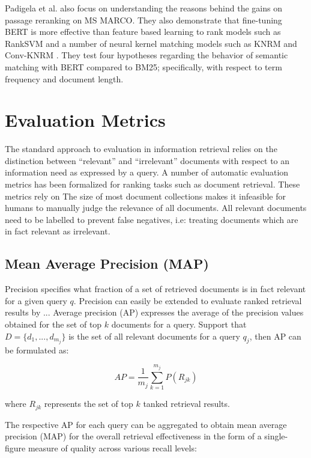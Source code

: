 Padigela et al. \cite{Padigela:1905.01758:2019} also focus on understanding the reasons behind the gains on passage reranking on MS MARCO.
They also demonstrate that fine-tuning BERT is more effective than feature based learning to rank models such as RankSVM \cite{joachims2002optimizing} and a number of neural kernel matching models such as KNRM \cite{xiong2017knrm} and Conv-KNRM \cite{dai2018convolutional}.
They test four hypotheses regarding the behavior of semantic matching with BERT compared to BM25; specifically, with respect to term frequency and document length.

\section{Evaluation Metrics}

The standard approach to evaluation in information retrieval relies on the distinction between ``relevant'' and ``irrelevant'' documents with respect to an information need as expressed by a query.
A number of automatic evaluation metrics has been formalized for ranking tasks such as document retrieval.
These metrics rely on 
The size of most document collections makes it infeasible for humans to manually judge the relevance of all documents.
All relevant documents need to be labelled to prevent false negatives, i.e: treating documents which are in fact relevant as irrelevant.

\subsection{Mean Average Precision (MAP)}

Precision specifies what fraction of a set of retrieved documents is in fact relevant for a given query $ q $.
Precision can easily be extended to evaluate ranked retrieval results by ...
Average precision (AP) expresses the average of the precision values obtained for the set of top $ k $ documents for a query.
Support that $ D = \{d_1, ..., d_{m_j}\} $ is the set of all relevant documents for a query $ q_j $, then AP can be formulated as:

\begin{equation}
AP = \frac{1}{m_j} \sum^{m_j} _{k = 1} P(R_{jk})
\end{equation}

where $ R_{jk} $ represents the set of top $ k $ tanked retrieval results.

The respective AP for each query can be aggregated to obtain mean average precision (MAP) for the overall retrieval effectiveness in the form of a single-figure measure of quality across various recall levels:

